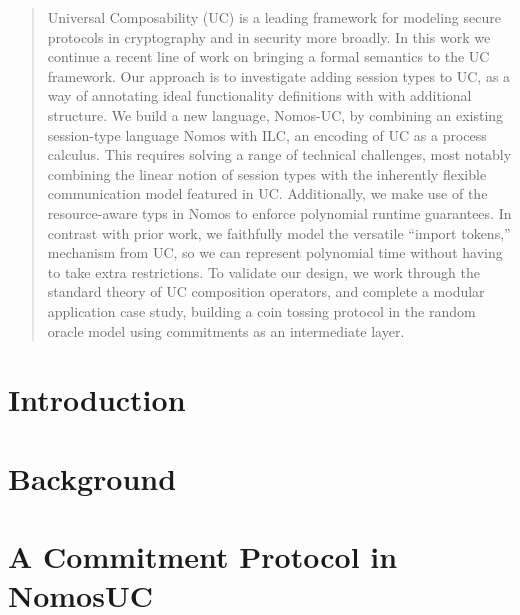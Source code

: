 \documentclass[acmsmall, screen, review, anonymous]{acmart}
\begin{document}
\begin{abstract}
Universal Composability (UC) is a leading framework for modeling secure protocols in cryptography and in security more broadly.
In this work we continue a recent line of work on bringing a formal semantics to the UC framework.
Our approach is to investigate adding session types to UC, as a way of annotating ideal functionality definitions with with additional structure.
We build a new language, Nomos-UC, by combining an existing session-type language Nomos with ILC, an encoding of UC as a process calculus.
This requires solving a range of technical challenges, most notably combining the linear notion of session types with the inherently flexible communication model featured in UC.
Additionally, we make use of the resource-aware typs in Nomos to enforce polynomial runtime guarantees.
In contrast with prior work, we faithfully model the versatile ``import tokens,'' mechanism from UC, so we can represent polynomial time without having to take extra restrictions.
To validate our design, we work through the standard theory of UC composition operators, and complete a modular application case study, building a coin tossing protocol in the random oracle model using commitments as an intermediate layer.

\end{abstract}

\maketitle



\section{Introduction}


\section{Background} \label{sec:background}


\section{A Commitment Protocol in NomosUC} \label{sec:example}

\end{document}
